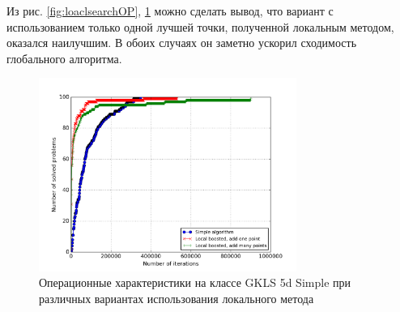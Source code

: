 Из рис. \ref{fig:loaclsearchOP}, \ref{fig:loaclsearchOP5d} можно сделать вывод, что вариант с использованием только одной лучшей точки, полученной локальным методом, оказался наилучшим.
В обоих случаях он заметно ускорил сходимость глобального алгоритма.
\begin{figure}[ht]
  \center
  \includegraphics[width=0.75\textwidth]{images/local_search_op5d.png}
  \caption{Операционные характеристики на классе GKLS 5d Simple при различных вариантах использования локального метода}
  \label{fig:loaclsearchOP5d}
\end{figure}
